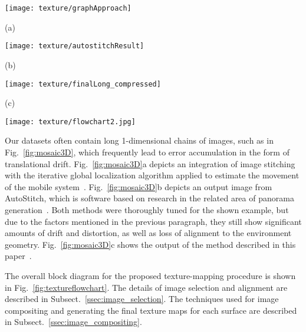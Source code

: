 \documentclass[10pt,twocolumn,twoside]{IEEEtran}
\begin{document}
\begin{figure*}
	\begin{minipage}[t]{0.95\linewidth}
		\centering
		\texttt{[image: texture/graphApproach]}
		\centerline{(a)}\medskip
  	\end{minipage}
	\begin{minipage}[t]{0.95\linewidth}
		\centering
		\texttt{[image: texture/autostitchResult]}
		\centerline{(b)}\medskip
  	\end{minipage}
	\begin{minipage}[t]{0.95\linewidth}
		\centering
		\texttt{[image: texture/finalLong\_compressed]}
		\centerline{(c)}\medskip
  	\end{minipage}
  \caption{Texture alignment via (a) the graph-based localization
    refinement algorithm; (b) the AutoStitch software package; (c)
    the method proposed in this paper.}
  \label{fig:mosaic3D}
\end{figure*}

\begin{figure*}
	\centerline{\texttt{[image: texture/flowchart2.jpg]}}
	\caption{The proposed texture-mapping procedure}
	\label{fig:textureflowchart}
\end{figure*}

Our datasets often contain long 1-dimensional
chains of images, such as in Fig.~\ref{fig:mosaic3D}, which frequently
lead to error accumulation in the form of translational drift. Fig.~\ref{fig:mosaic3D}a depicts an integration of image stitching with the iterative global localization algorithm applied to estimate the movement of the mobile system~\cite{liu2010indoor}. Fig.~\ref{fig:mosaic3D}b depicts an output image from AutoStitch, which is software based on research in the related area of panorama generation~\cite{panorama2d,autostitch}. Both methods were thoroughly tuned for the shown example, but due to the factors mentioned in the previous paragraph, they still show significant amounts of drift and distortion, as well as loss of alignment to the environment geometry. Fig.~\ref{fig:mosaic3D}c shows the output of the method described in this paper~\cite{Cheng14}.

The overall block diagram for the proposed texture-mapping procedure is shown in Fig.~\ref{fig:textureflowchart}. The details of image selection and alignment are described in Subsect.~\ref{ssec:image_selection}.  The techniques used for image compositing and generating the final texture maps for each surface are described in Subsect.~\ref{ssec:image_compositing}.
\end{document}
